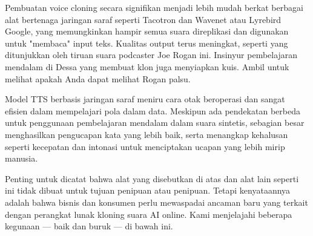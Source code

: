 Pembuatan voice cloning secara signifikan menjadi lebih mudah berkat berbagai alat bertenaga jaringan saraf seperti Tacotron dan Wavenet atau Lyrebird Google, yang memungkinkan hampir semua suara direplikasi dan digunakan untuk "membaca" input teks. Kualitas output terus meningkat, seperti yang ditunjukkan oleh tiruan suara podcaster Joe Rogan ini. Insinyur pembelajaran mendalam di Dessa yang membuat klon juga menyiapkan kuis. Ambil untuk melihat apakah Anda dapat melihat Rogan palsu.

Model TTS berbasis jaringan saraf meniru cara otak beroperasi dan sangat efisien dalam mempelajari pola dalam data. Meskipun ada pendekatan berbeda untuk penggunaan pembelajaran mendalam dalam suara sintetis, sebagian besar menghasilkan pengucapan kata yang lebih baik, serta menangkap kehalusan seperti kecepatan dan intonasi untuk menciptakan ucapan yang lebih mirip manusia. 

Penting untuk dicatat bahwa alat yang disebutkan di atas dan alat lain seperti ini tidak dibuat untuk tujuan penipuan atau penipuan. Tetapi kenyataannya adalah bahwa bisnis dan konsumen perlu mewaspadai ancaman baru yang terkait dengan perangkat lunak kloning suara AI online. Kami menjelajahi beberapa kegunaan — baik dan buruk — di bawah ini. 

